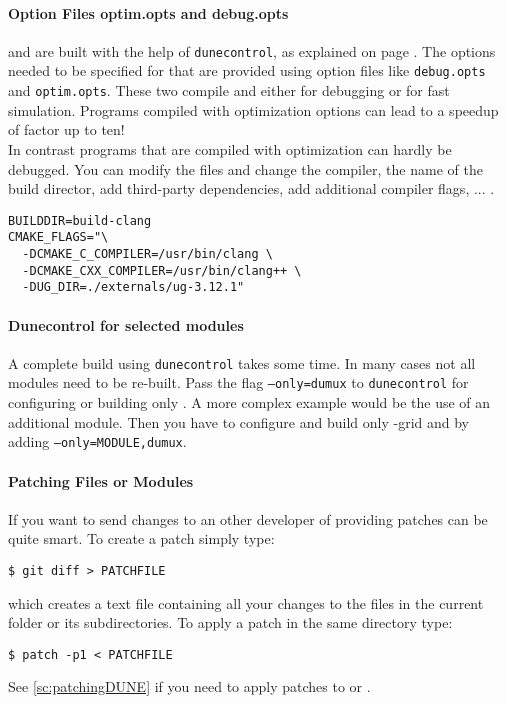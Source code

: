 \paragraph{Option Files optim.opts and debug.opts}
\Dune and \Dumux are built with the help of \texttt{dunecontrol}, as explained on page \pageref{buildIt}.
The options needed to be specified for that are provided using option files like
\texttt{debug.opts} and \texttt{optim.opts}. These two compile \Dune and \Dumux
either for debugging or for fast simulation. Programs compiled with optimization options
can lead to a speedup of factor up to ten!\\
In contrast programs that are compiled with optimization can hardly be debugged.
You can modify the files and change the compiler, the name of the build director,
add third-party dependencies, add additional compiler flags, ... .
\begin{lstlisting}[style=Shell]
BUILDDIR=build-clang
CMAKE_FLAGS="\
  -DCMAKE_C_COMPILER=/usr/bin/clang \
  -DCMAKE_CXX_COMPILER=/usr/bin/clang++ \
  -DUG_DIR=./externals/ug-3.12.1"
\end{lstlisting}

\paragraph{Dunecontrol for selected modules}
A complete build using \texttt{dunecontrol} takes some time. In many cases not all modules need to be re-built.
Pass the flag \texttt{--only=dumux} to \texttt{dunecontrol} for configuring or building only \Dumux. A more
complex example would be the use of an additional module. Then you have to configure and build only \Dune{}-grid
and \Dumux by adding \texttt{--only=MODULE,dumux}.

\paragraph{Patching Files or Modules}
If you want to send changes to an other developer of \Dumux providing patches
can be quite smart. To create a patch simply type:
\begin{lstlisting}[style=Bash]
$ git diff > PATCHFILE
\end{lstlisting}
\noindent which creates a text file containing all your changes to the files
in the current folder or its subdirectories.
To apply a patch in the same directory type:
\begin{lstlisting}[style=Bash]
$ patch -p1 < PATCHFILE
\end{lstlisting}
See \ref{sc:patchingDUNE} if you need to apply patches to \Dumux or \Dune.

